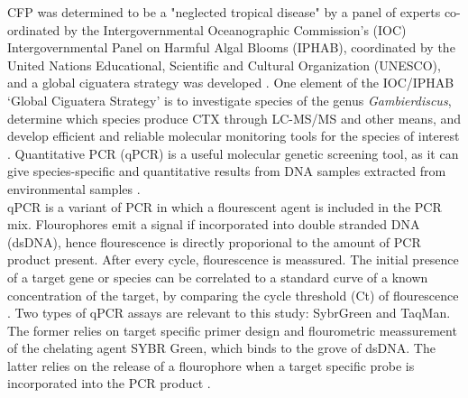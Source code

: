 \documentclass[12pt]{article}
\begin{document}
CFP was determined  to be  a "neglected tropical disease" by a panel of experts co-ordinated by the Intergovernmental Oceanographic Commission’s (IOC) Intergovernmental Panel on Harmful Algal Blooms (IPHAB), coordinated by the United Nations Educational, Scientific and Cultural Organization (UNESCO), and a global ciguatera strategy was developed \cite{globalcig}. 
One element of the IOC/IPHAB ‘Global Ciguatera Strategy’ is to  investigate species of the genus \emph{Gambierdiscus}, determine which species produce CTX through LC-MS/MS and other means, and develop efficient and reliable molecular monitoring tools for the species of interest \citep{globalcig}. Quantitative PCR (qPCR) is a useful molecular genetic screening tool, as it can give species-specific and quantitative results from DNA samples extracted from environmental samples \citep{globalcig}. \\

qPCR is a variant of PCR in which a flourescent agent is included in the PCR mix. Flourophores emit a signal if incorporated into double stranded DNA (dsDNA), hence flourescence is directly proporional to the amount of PCR product present. After every cycle, flourescence is meassured. The initial presence of a target gene or species can be correlated to a standard curve of a known concentration of the target, by comparing the cycle threshold (Ct) of flourescence \citep{smith2009advantages}.
Two types of qPCR assays are relevant to this study: SybrGreen and TaqMan. The former relies on target specific primer design and flourometric meassurement of the chelating agent SYBR Green, which binds to the grove of dsDNA. The latter relies on the release of a flourophore when a target specific probe is incorporated into the PCR product \citep{smith2009advantages}. %
\end{document}
